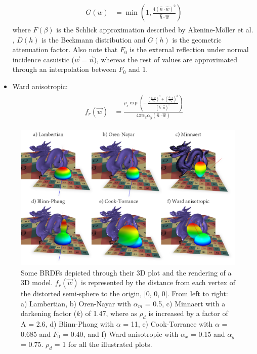 \begin{itemize}
\begin{gather}
\begin{aligned}
            G(w) &= \min\left(1, \frac{4(\hat{n} \cdot \hat{w})^{2}}{\hat{h} \cdot \hat{w} }\right)
        \end{aligned}
    \end{gather}
    where $F(\beta)$ is the Schlick approximation described by Akenine-Möller et al. \cite{akenine-moller_real-time_2018}, $D(h)$ is the Beckmann distribution \cite{montes_soldado_overview_2012} and $G(h)$ is the geometric attenuation factor. Also note that $F_{0}$ is the external reflection under normal incidence casuistic ($\vec{w} = \vec{n}$), whereas the rest of values are approximated through an interpolation between $F_{0}$ and 1.
    \item Ward anisotropic: 
    \begin{gather}
        \label{eq:ward_brdf}
        \begin{aligned}
            f_{r}(\vec{w}) &= \frac{\rho_{s}\exp\left(-\frac{\left(\frac{h \cdot x}{\alpha_{x}}\right)^{2} + \left(\frac{h \cdot y}{\alpha_{y}}\right)^{2}}{(\hat{h} \cdot \hat{n})^{2}} \right)}{4\pi\alpha_{x}\alpha_{y} (\hat{n} \cdot \hat{w})}
        \end{aligned}
    \end{gather}
\end{itemize}

\begin{figure}
    \centering
    \includegraphics[width=\linewidth]{figs/lidar_intensity/analytical_brdfs.png}
    \caption{Some BRDFs depicted through their 3D plot and the rendering of a 3D model. $f_{r}(\vec{w})$ is represented by the distance from each vertex of the distorted semi-sphere to the origin, [0, 0, 0]. From left to right: a) Lambertian, b) Oren-Nayar with $\alpha_{m}$ = 0.5, c) Minnaert with a darkening factor ($k$) of 1.47, where as $\rho_{d}$ is increased by a factor of A = 2.6, d) Blinn-Phong with $\alpha$ = 11, e) Cook-Torrance with $\alpha$ = 0.685 and $F_{0}$ = 0.40, and f) Ward anisotropic with $\alpha_{x}$ = 0.15 and $\alpha_{y}$ = 0.75. $\rho_{d}$ = 1 for all the illustrated plots.  }
	\label{fig:lidar_analytical_brdfs}
\end{figure}

